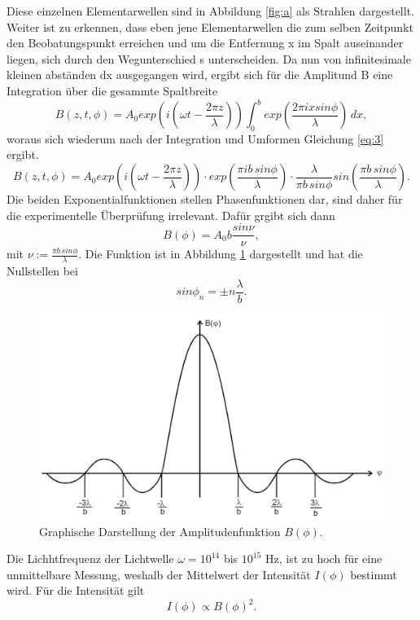 Diese einzelnen Elementarwellen sind in Abbildung \ref{fig:a} als Strahlen dargestellt. Weiter ist zu erkennen, dass eben jene 
Elementarwellen die zum selben Zeitpunkt den Beobatungspunkt erreichen und um die Entfernung x im Spalt auseinander liegen, 
sich durch den Wegunterschied s unterscheiden. Da nun von infinitesimale kleinen abständen dx ausgegangen wird, ergibt sich 
für die Amplitund B eine Integration über die gesammte Spaltbreite
\begin{equation}
    \label{eq:2}
    B(z,t,\phi) = A_0 exp\left( i \left( \omega t - \frac{2 \pi z }{\lambda}\right)\right) \int_{0}^{b} exp\left(\frac{2 \pi i x sin \phi}{\lambda}\right) \,dx ,
\end{equation}
woraus sich wiederum nach der Integration und Umformen Gleichung \eqref{eq:3} ergibt.
\begin{equation}
    \label{eq:3}
    B(z,t,\phi) = A_0 exp\left(i \left(\omega t - \frac{2 \pi z}{\lambda}\right)\right) \cdot exp\left(\frac{\pi i b \, sin \phi}{\lambda}\right) \cdot \frac{\lambda}{\pi b \, sin \phi} sin\left(\frac{\pi b \, sin \phi}{\lambda}\right).
\end{equation}
Die beiden Exponentialfunktionen stellen Phasenfunktionen dar, sind daher für die experimentelle Überprüfung irrelevant.
Dafür grgibt sich dann 
\begin{equation}
    \label{eq:4}
    B(\phi) = A_0 b \frac{sin \nu}{\nu},
\end{equation}
mit $\nu := \frac{\pi b \, sin \phi}{\lambda}$.
Die Funktion ist in Abbildung \ref{fig:b} dargestellt und hat die Nullstellen bei 
\begin{equation}
    \label{eq:5}
    sin \phi_n = \pm n\frac{\lambda}{b}.
\end{equation}
\begin{figure}[H]
    \centering
    \includegraphics{Funktion.png}
    \caption{Graphische Darstellung der Amplitudenfunktion $B(\phi)$.}
    \label{fig:b}
\end{figure}
Die Lichhtfrequenz der Lichtwelle $\omega = 10^14$ bis $10^15$ Hz, ist zu hoch für eine unmittelbare Messung, 
weshalb der Mittelwert der Intensität $I(\phi)$ bestimmt wird. Für die Intensität gilt 
\begin{equation}
    \label{eq:6}
    I(\phi) \propto B(\phi)^2.
\end{equation}

